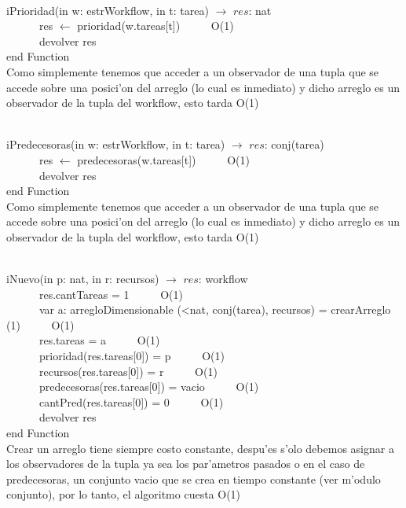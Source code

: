 \documentclass[a4paper,10pt]{article}
\begin{document}
\begin{algoritmo}
\caption{}\\
  iPrioridad(in w: estrWorkflow, in t: tarea) $\rightarrow$ $res$: nat\\
    \indent \ \ \ \ \ \  res $\gets$ prioridad(w.tareas[t])   \ \ \ \ \ O(1)\\   
    \indent \ \ \ \ \ \  devolver res    \\
     end Function \\
   
   Como simplemente tenemos que acceder a un observador de una tupla que se accede sobre una posici'on del arreglo (lo cual es inmediato) y dicho arreglo es un observador de la tupla del workflow, esto tarda O(1)  
\end{algoritmo}

\begin{algoritmo}
\caption{}\\
  iPredecesoras(in w: estrWorkflow, in t: tarea) $\rightarrow$ $res$: conj(tarea)\\
    \indent \ \ \ \ \ \  res $\gets$ predecesoras(w.tareas[t])   \ \ \ \ \ O(1)\\   
    \indent \ \ \ \ \ \  devolver res    \\
     end Function \\
   
   Como simplemente tenemos que acceder a un observador de una tupla que se accede sobre una posici'on del arreglo (lo cual es inmediato) y dicho arreglo es un observador de la tupla del workflow, esto tarda O(1) 
\end{algoritmo}

\newpage
\begin{algoritmo}
\caption{}\\
  iNuevo(in p: nat, in r: recursos) $\rightarrow$ $res$: workflow\\
    \indent \ \ \ \ \ \  res.cantTareas = 1   \ \ \ \ \ O(1)\\
    \indent \ \ \ \ \ \  var a: arregloDimensionable (<nat, conj(tarea), recursos) = crearArreglo (1)  \ \ \ \ \ O(1) \\ 
    \indent \ \ \ \ \ \  res.tareas = a \ \ \ \ \ O(1)\\
    \indent \ \ \ \ \ \  prioridad(res.tareas[0]) = p \ \ \ \ \ O(1)\\ 
    \indent \ \ \ \ \ \  recursos(res.tareas[0]) = r \ \ \ \ \ O(1)\\
    \indent \ \ \ \ \ \  predecesoras(res.tareas[0]) = vacio \ \ \ \ \ O(1)\\
    \indent \ \ \ \ \ \  cantPred(res.tareas[0]) = 0 \ \ \ \ \ O(1)\\
    \indent \ \ \ \ \ \  devolver res    \\
   end Function \\
   
   Crear un arreglo tiene siempre costo constante, despu'es s'olo debemos asignar a los observadores de la tupla ya sea los par'ametros pasados o en el caso de predecesoras, un conjunto vacio que se crea en tiempo constante (ver m'odulo conjunto), por lo tanto, el algoritmo cuesta O(1)
\end{algoritmo}
\end{document}
